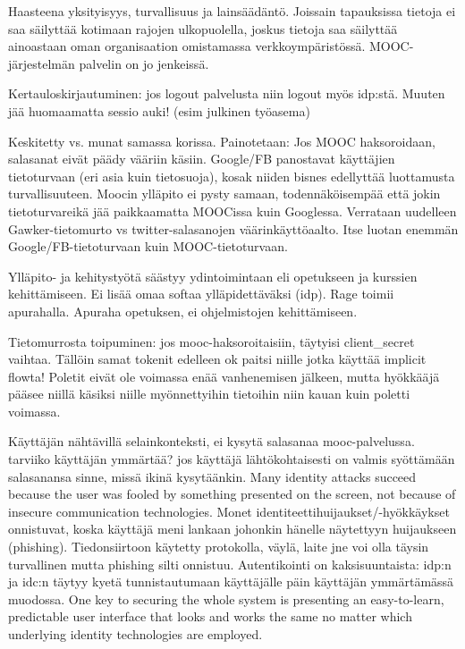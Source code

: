 \documentclass[finnish,gradu]{tktltiki}
\begin{document}
  Haasteena yksityisyys, turvallisuus ja lainsäädäntö. Joissain tapauksissa tietoja ei saa säilyttää kotimaan rajojen ulkopuolella, joskus tietoja saa säilyttää ainoastaan oman organisaation omistamassa verkkoympäristössä. MOOC-järjestelmän palvelin on jo jenkeissä.

  Kertauloskirjautuminen: jos logout palvelusta niin logout myös idp:stä. Muuten jää huomaamatta sessio auki! (esim julkinen työasema)



  Keskitetty vs. munat samassa korissa. Painotetaan: Jos MOOC haksoroidaan, salasanat eivät päädy vääriin käsiin. Google/FB panostavat käyttäjien tietoturvaan (eri asia kuin tietosuoja), kosak niiden bisnes edellyttää luottamusta turvallisuuteen. Moocin ylläpito ei pysty samaan, todennäköisempää että jokin tietoturvareikä jää paikkaamatta MOOCissa kuin Googlessa. Verrataan uudelleen Gawker-tietomurto vs twitter-salasanojen väärinkäyttöaalto. Itse luotan enemmän Google/FB-tietoturvaan kuin MOOC-tietoturvaan.

  Ylläpito- ja kehitystyötä säästyy ydintoimintaan eli opetukseen ja kurssien kehittämiseen. Ei lisää omaa softaa ylläpidettäväksi (idp). Rage toimii apurahalla. Apuraha opetuksen, ei ohjelmistojen kehittämiseen.

  Tietomurrosta toipuminen: jos mooc-haksoroitaisiin, täytyisi client\_secret vaihtaa. Tällöin samat tokenit edelleen ok paitsi niille jotka käyttää implicit flowta! Poletit eivät ole voimassa enää vanhenemisen jälkeen, mutta hyökkääjä pääsee niillä käsiksi niille myönnettyihin tietoihin niin kauan kuin poletti voimassa.

  Käyttäjän nähtävillä selainkonteksti, ei kysytä salasanaa mooc-palvelussa. tarviiko käyttäjän ymmärtää? jos käyttäjä lähtökohtaisesti on valmis syöttämään salasanansa sinne, missä ikinä kysytäänkin.
  Many identity attacks succeed because the user was fooled by something presented on the screen, not because of insecure  communication technologies. Monet identiteettihuijaukset/-hyökkäykset onnistuvat, koska käyttäjä meni lankaan johonkin hänelle näytettyyn huijaukseen (phishing). Tiedonsiirtoon käytetty protokolla, väylä, laite jne voi olla täysin turvallinen mutta phishing silti onnistuu. Autentikointi on kaksisuuntaista: idp:n ja idc:n täytyy kyetä tunnistautumaan käyttäjälle päin käyttäjän ymmärtämässä muodossa.
  One key to securing the whole system is presenting an easy-to-learn, predictable user interface that looks and works the same no matter which underlying identity technologies are employed.
\end{document}
